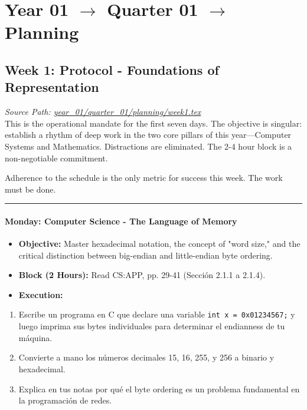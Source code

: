 \documentclass[11pt,a4paper]{report}
\begin{document}
\chapter{Year 01 $\rightarrow$ Quarter 01 $\rightarrow$ Planning}
\section{Week 1: Protocol - Foundations of Representation}
\noindent\textit{Source Path: \href{https://github.com/TEGDV/QuantitativeSystemsEngineering/blob/main/year_01/quarter_01/planning/week1.tex}{year\_01/quarter\_01/planning/week1.tex}}\\


This is the operational mandate for the first seven days. The objective is singular: establish a rhythm of deep work in the two core pillars of this year—Computer Systems and Mathematics. Distractions are eliminated. The 2-4 hour block is a non-negotiable commitment.

Adherence to the schedule is the only metric for success this week. The work must be done.

\noindent\rule{\textwidth}{0.4pt}

\subsubsection{\textbf{Monday: Computer Science - The Language of Memory}}
\begin{itemize}
  \item \textbf{Objective:} Master hexadecimal notation, the concept of "word size," and the critical distinction between big-endian and little-endian byte ordering.
  \item \textbf{Block (2 Hours):} Read CS:APP, pp. 29-41 (Sección 2.1.1 a 2.1.4).
  \item \textbf{Execution:}
\end{itemize}
\begin{enumerate}
  \item Escribe un programa en C que declare una variable \texttt{int x = 0x01234567;} y luego imprima sus bytes individuales para determinar el endianness de tu máquina.
  \item Convierte a mano los números decimales 15, 16, 255, y 256 a binario y hexadecimal.
  \item Explica en tus notas por qué el byte ordering es un problema fundamental en la programación de redes.

\end{enumerate}
\end{document}
